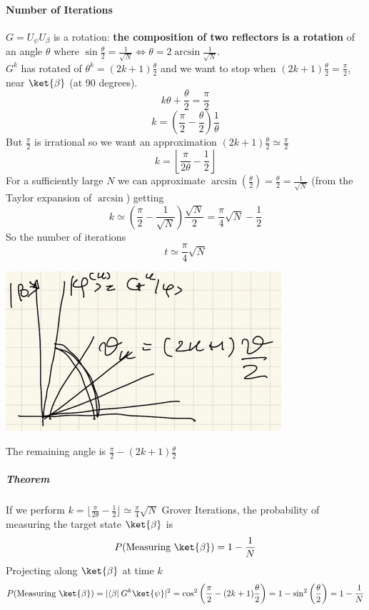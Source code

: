 \documentclass[10pt]{report}
\begin{document}
\paragraph{Number of Iterations}
$G = U_\psi U_\beta$ is a rotation: \textbf{the composition of two reflectors is a rotation} of an angle $\theta$ where $\sin\frac{\theta}{2}=\frac{1}{\sqrt{N}}\Leftrightarrow\theta = 2\arcsin\frac{1}{\sqrt{N}}$.\\
$G^k$ has rotated of $\theta^k = (2k+1)\frac{\theta}{2}$ and we want to stop when $(2k+1)\frac{\theta}{2}=\frac{\pi}{2}$, near $\ket{\beta}$ (at 90 degrees).
$$k\theta + \frac{\theta}{2} = \frac{\pi}{2}$$
$$k = \left(\frac{\pi}{2}-\frac{\theta}{2}\right)\frac{1}{\theta}$$
But $\frac{\pi}{2}$ is irrational so we want an approximation
$(2k+1)\frac{\theta}{2}\simeq\frac{\pi}{2}$
$$k=\left\lfloor\frac{\pi}{2\theta}-\frac{1}{2}\right\rfloor$$
For a sufficiently large $N$ we can approximate $\arcsin\left(\frac{\theta}{2}\right) = \frac{\theta}{2} = \frac{1}{\sqrt{N}}$ (from the Taylor expansion of $\arcsin$) getting
$$k\simeq\left(\frac{\pi}{2}-\frac{1}{\sqrt{N}}\right)\frac{\sqrt{N}}{2} = \frac{\pi}{4}\sqrt{N}-\frac{1}{2}$$
So the number of iterations $$t\simeq\frac{\pi}{4}\sqrt{N}$$
\begin{center}
	\includegraphics[scale=0.5]{36.png}
\end{center}
The remaining angle is $\frac{\pi}{2}-(2k+1)\frac{\theta}{2}$
\subparagraph{Theorem} If we perform $k=\lfloor\frac{\pi}{2\theta}-\frac{1}{2}\rfloor\simeq\frac{\pi}{4}\sqrt{N}$ Grover Iterations, the probability of measuring the target state $\ket{\beta}$ is $$P(\hbox{Measuring }\ket{\beta}) = 1-\frac{1}{N}$$
Projecting along $\ket{\beta}$ at time $k$
$$P(\hbox{Measuring }\ket{\beta}) = |\langle\beta|\:G^k\ket{\psi}|^2 = \cos^2\left(\frac{\pi}{2}-(2k+1)\frac{\theta}{2}\right) = 1-\sin^2\left(\frac{\theta}{2}\right) = 1-\frac{1}{N}$$
\end{document}

